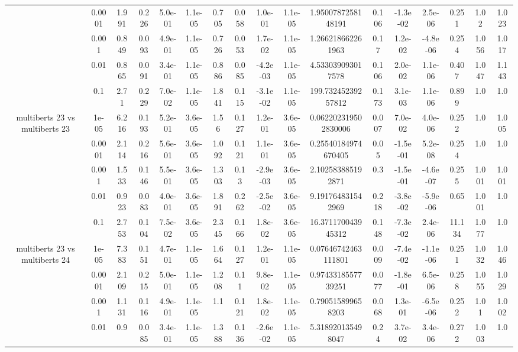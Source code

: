 \begin{tabular}{|c|c|c|c|c|c|c|c|c|c|c|c|c|c|c|c|c|}
 & 0.0001 & 1.991 & 0.226 & 5.0e-01 & 1.1e-05 & 0.705 & 0.058 & 1.0e-01 & 1.1e-05 & 1.9500787258148191 & 0.106 & -1.3e-02 & 2.5e-06 & 0.251 & 1.02 & 1.023 \\
 & 0.001 & 0.849 & 0.093 & 4.9e-01 & 1.1e-05 & 0.726 & 0.053 & 1.7e-02 & 1.1e-05 & 1.266218662261963 & 0.17 & 1.2e-02 & -4.8e-06 & 0.254 & 1.056 & 1.017 \\
 & 0.01 & 0.865 & 0.091 & 3.4e-01 & 1.1e-05 & 0.886 & 0.085 & -4.2e-03 & 1.1e-05 & 4.533039093017578 & 0.106 & 2.0e-02 & 1.1e-06 & 0.407 & 1.047 & 1.143 \\
 & 0.1 & 2.71 & 0.229 & 7.0e-02 & 1.1e-05 & 1.841 & 0.115 & -3.1e-02 & 1.1e-05 & 199.73245239257812 & 0.173 & 3.1e-03 & 1.1e-06 & 0.899 & 1.0 & 1.0 \\
\hline
\multirow{5}{*}{multiberts 23 vs multiberts 23} & 1e-05 & 6.216 & 0.193 & 5.2e-01 & 3.6e-05 & 1.56 & 0.127 & 1.2e-01 & 3.6e-05 & 0.062202319502830006 & 0.007 & 7.0e-02 & 4.0e-06 & 0.252 & 1.0 & 1.005 \\
 & 0.0001 & 2.114 & 0.216 & 5.6e-01 & 3.6e-05 & 1.092 & 0.121 & 1.1e-01 & 3.6e-05 & 0.25540184974670405 & 0.05 & -1.5e-01 & 5.2e-08 & 0.254 & 1.0 & 1.0 \\
 & 0.001 & 1.533 & 0.146 & 5.5e-01 & 3.6e-05 & 1.303 & 0.13 & -2.9e-03 & 3.6e-05 & 2.102583885192871 & 0.3 & -1.5e-01 & -4.6e-07 & 0.255 & 1.001 & 1.001 \\
 & 0.01 & 0.923 & 0.083 & 4.0e-01 & 3.6e-05 & 1.891 & 0.262 & -2.5e-02 & 3.6e-05 & 9.191764831542969 & 0.218 & -3.8e-02 & -5.9e-06 & 0.65 & 1.001 & 1.0 \\
 & 0.1 & 2.753 & 0.104 & 7.5e-02 & 3.6e-05 & 2.345 & 0.166 & 1.8e-02 & 3.6e-05 & 16.371170043945312 & 0.148 & -7.3e-02 & 2.4e-06 & 11.134 & 1.077 & 1.0 \\
\hline
\multirow{5}{*}{multiberts 23 vs multiberts 24} & 1e-05 & 7.383 & 0.151 & 4.7e-01 & 1.1e-05 & 1.664 & 0.127 & 1.2e-01 & 1.1e-05 & 0.07646742463111801 & 0.009 & -7.4e-02 & -1.1e-06 & 0.251 & 1.032 & 1.046 \\
 & 0.0001 & 2.109 & 0.215 & 5.0e-01 & 1.1e-05 & 1.208 & 0.11 & 9.8e-02 & 1.1e-05 & 0.9743318557739251 & 0.077 & -1.8e-01 & 6.5e-06 & 0.258 & 1.055 & 1.029 \\
 & 0.001 & 1.131 & 0.116 & 4.9e-01 & 1.1e-05 & 1.1 & 0.121 & 1.8e-02 & 1.1e-05 & 0.790515899658203 & 0.068 & 1.3e-01 & -6.5e-06 & 0.252 & 1.01 & 1.002 \\
 & 0.01 & 0.9 & 0.085 & 3.4e-01 & 1.1e-05 & 1.388 & 0.136 & -2.6e-02 & 1.1e-05 & 5.318920135498047 & 0.24 & 3.7e-02 & 3.4e-06 & 0.272 & 1.003 & 1.0 \\

\end{tabular}
